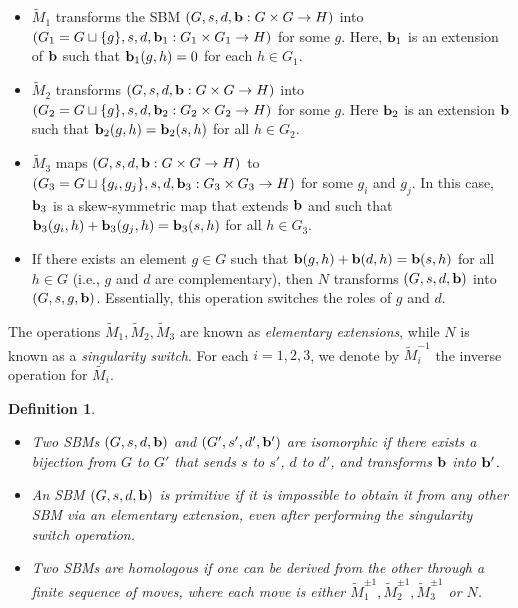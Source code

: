 \documentclass[12pt]{amsart}
\theoremstyle{noparens}
\newtheorem{definition}{Definition}[section]
\numberwithin{equation}{section}
\numberwithin{equation}{section}
\begin{document}
\begin{itemize}
	\item $\widetilde{M}_1$ transforms the SBM $(G, s, d, {\bf b} : G \times G \to H)$ into $(G_1 = G \sqcup \{g\}, s, d, {\bf b}_1 : G_1 \times G_1 \to H)$ for some $g$. Here, ${\bf b}_1$ is an extension of ${\bf b}$ such that  ${\bf b}_1(g, h) = 0$ for each $h \in G_1$. 
	\item $\widetilde{M}_2$ transforms $(G, s, d, {\bf b} : G \times G \to H)$ into $(G_2 = G \sqcup \{g\}, s, d, {\bf b}_2 : G_2 \times G_2 \to H)$ for some $g$. Here ${\bf b}_2$ is an extension ${\bf b}$ such that ${\bf b}_2(g, h) = {\bf b}_2(s, h)$ for all $h\in G_2.$ 
	\item $\widetilde{M}_3$ maps $(G, s, d, {\bf b} : G \times G \to H)$ to $(G_3 = G \sqcup \{g_i, g_j\}, s, d, {\bf b}_3 : G_3 \times G_3 \to H)$ for some $g_i$ and $g_j$. In this case, ${\bf b}_3$ is a skew-symmetric map that extends ${\bf b}$ and such that ${\bf b}_3(g_i, h) + {\bf b}_3(g_j, h) = {\bf b}_3(s, h)$ for all $h\in G_3$. 
	\item If there exists an element $g\in G$ such that ${\bf b}(g, h) + {\bf b}(d, h) = {\bf b}(s, h)$ for all $h\in G$ (i.e., $g$ and $d$ are complementary), then $N$ transforms $(G, s, d, {\bf b})$ into $(G, s, g, {\bf b})$. Essentially, this operation switches the roles of $g$ and $d$.
\end{itemize}
The operations $\widetilde{M}_1, \widetilde{M}_2, \widetilde{M}_3$ are known as \textit{elementary extensions}, while $N$ is known as a \textit{singularity switch}. For each $i=1,2,3$, we denote by $\widetilde{M}_i^{-1}$ the inverse operation for $\widetilde{M_i}$. 

\begin{definition} \cite[Def.~4.9]{Hen} \label{def:primitive} 
	{\rm 
		\begin{itemize}
			\item[(i)] Two SBMs $(G, s, d, {\bf b})$ and $(G', s', d', {\bf b}')$ are \textit{isomorphic} if there exists a bijection from $G$ to $G'$ that sends $s$ to $s'$, $d$ to $d'$, and transforms ${\bf b}$ into ${\bf b}'$. 
			\item[(ii)] An SBM $(G, s, d, {\bf b})$ is \textit{primitive} if it is impossible to obtain it from any other SBM via an elementary extension, even after performing the singularity switch operation. 
			\item[(iii)] Two SBMs are \textit{homologous} if one can be derived from the other through a finite sequence of moves, where each move is either $\widetilde{M}_1^{\pm 1}, \widetilde{M}_2^{\pm 1}, \widetilde{M}_3^{\pm 1}$ or $N$.
		\end{itemize}
	}
\end{definition}
\end{document}
